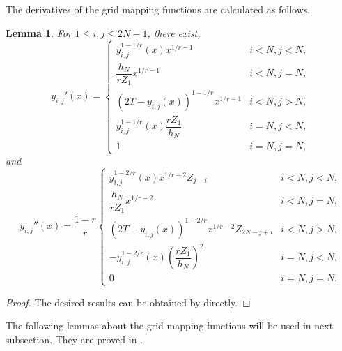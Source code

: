 \documentclass{amsart}
\newtheorem{lemma}[theorem]{Lemma}
\theoremstyle{definition}
\theoremstyle{remark}
\numberwithin{equation}{section}
\begin{document}
The derivatives of the grid mapping functions are calculated as follows.
\begin{lemma} \label{lmm:derivatives-of-MTFs}
For $1\le i,j \le 2N-1$, there exist, %
  \begin{equation*}
    y_{i,j}'(x) = \begin{cases}
      y_{i,j}^{1-1/r}(x) x^{1/r-1}   & i< N, j< N, \\
      \dfrac{h_N}{r Z_1} x^{1/r-1}  & i< N, j=N, \\
      (2T-y_{i,j}(x))^{1-1/r} x^{1/r-1}   & i< N, j>N, \\
      y_{i,j}^{1-1/r}(x) \dfrac{r Z_1}{h_N}  & i=N, j< N, \\
      1   & i=N, j=N ,
    \end{cases}
  \end{equation*}
  and
  \begin{equation*}
    y_{i,j}''(x) = \frac{1-r}{r}
      \begin{cases}
        y_{i,j}^{1-2/r}(x) x^{1/r-2} Z_{j-i}   & i< N, j< N, \\
        \dfrac{h_N}{r Z_1} x^{1/r-2}  & i< N, j=N, \\
        (2T-y_{i,j}(x))^{1-2/r} x^{1/r-2} Z_{2N-j+i}   & i< N, j>N, \\
        -y_{i,j}^{1-2/r}(x) \left(\dfrac{r Z_1}{h_N}\right)^2  & i=N, j< N, \\
        0   & i=N, j=N .
      \end{cases}
  \end{equation*}
\end{lemma}
\begin{proof}
    The desired results can be obtained by  directly.
\end{proof}


The following lemmas about the grid mapping functions will be used in next subsection.
They are proved in .
\end{document}
